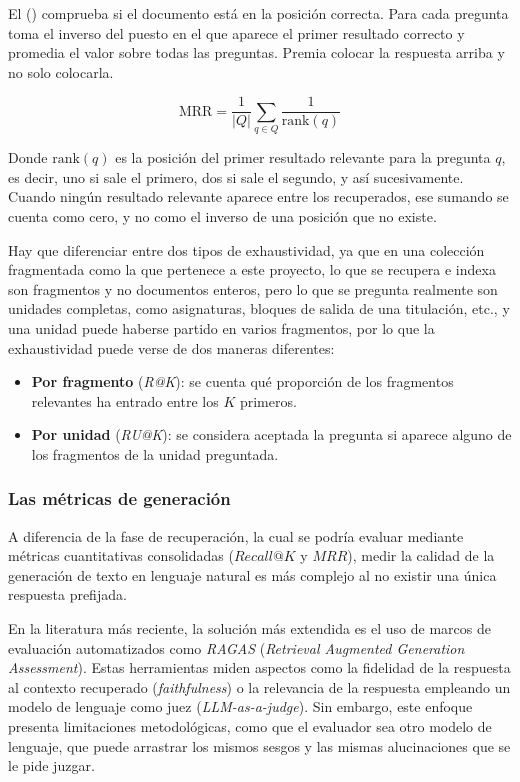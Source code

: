 El  () comprueba si el documento está en la posición correcta. Para cada pregunta toma el inverso del puesto en el que aparece el primer resultado correcto y promedia el valor sobre todas las preguntas. Premia colocar la respuesta arriba y no solo colocarla.

\begin{equation}
  \text{MRR} = \frac{1}{|Q|} \sum_{q \in Q} \frac{1}{\text{rank}(q)}
  \label{eq:mrr}
\end{equation}

Donde $\text{rank}(q)$ es la posición del primer resultado relevante para
  la pregunta $q$, es decir, uno si sale el primero, dos si sale el segundo, y así sucesivamente. Cuando
  ningún resultado relevante aparece entre los recuperados, ese sumando se cuenta como cero, y
  no como el inverso de una posición que no existe.

  Hay que diferenciar entre dos tipos de exhaustividad, ya que en una colección fragmentada como la que pertenece a este proyecto, lo que se recupera e indexa son fragmentos y no documentos enteros, pero lo que se pregunta realmente son unidades completas, como asignaturas, bloques de salida de una titulación, etc., y una unidad puede haberse partido en varios fragmentos, por lo que la exhaustividad puede verse de dos maneras diferentes:
\begin{itemize}
  \item \textbf{Por fragmento} (\textit{R@K}): se cuenta qué proporción de los fragmentos relevantes ha entrado entre los $K$ primeros. 
  \item \textbf{Por unidad} (\textit{RU@K}): se considera aceptada la pregunta si aparece alguno de los fragmentos de la unidad preguntada.
\end{itemize}


\subsubsection{Las métricas de generación}

A diferencia de la fase de recuperación, la cual se podría evaluar mediante métricas cuantitativas consolidadas ($Recall@K$ y $MRR$), medir la calidad de la generación de texto en lenguaje natural es más complejo al no existir una única respuesta prefijada.

En la literatura más reciente, la solución más extendida es el uso de marcos de evaluación automatizados como \textit{RAGAS} (\textit{Retrieval Augmented Generation Assessment})\cite{es2023ragas}. Estas herramientas miden aspectos como la fidelidad de la respuesta al contexto recuperado (\textit{faithfulness}) o la relevancia de la respuesta empleando un modelo de lenguaje como juez (\textit{LLM-as-a-judge}). Sin embargo, este enfoque presenta limitaciones metodológicas, como que el evaluador sea otro modelo de lenguaje, que puede arrastrar los mismos sesgos y las mismas alucinaciones que se le pide juzgar.

